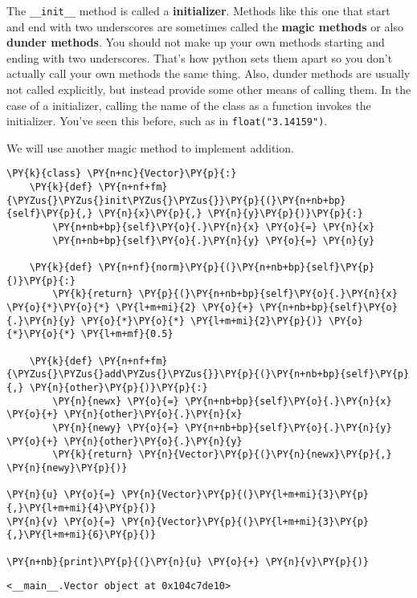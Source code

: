 The \texttt{\_\_init\_\_} method is called a \textbf{initializer}.  Methods like this one that start and end with two underscores are sometimes called the \textbf{magic methods} or also \textbf{dunder methods}.  You should not make up your own methods starting and ending with two underscores.  That's how python sets them apart so you don't actually call your own methods the same thing.  Also, dunder methods are usually not called explicitly, but instead provide some other means of calling them.  In the case of a initializer, calling the name of the class as a function invokes the initializer.  You've seen this before, such as in \texttt{float("3.14159")}.


We will use another magic method to implement addition.


\begin{Verbatim}[commandchars=\\\{\}]
\PY{k}{class} \PY{n+nc}{Vector}\PY{p}{:}
    \PY{k}{def} \PY{n+nf+fm}{\PYZus{}\PYZus{}init\PYZus{}\PYZus{}}\PY{p}{(}\PY{n+nb+bp}{self}\PY{p}{,} \PY{n}{x}\PY{p}{,} \PY{n}{y}\PY{p}{)}\PY{p}{:}
        \PY{n+nb+bp}{self}\PY{o}{.}\PY{n}{x} \PY{o}{=} \PY{n}{x}
        \PY{n+nb+bp}{self}\PY{o}{.}\PY{n}{y} \PY{o}{=} \PY{n}{y}

    \PY{k}{def} \PY{n+nf}{norm}\PY{p}{(}\PY{n+nb+bp}{self}\PY{p}{)}\PY{p}{:}
        \PY{k}{return} \PY{p}{(}\PY{n+nb+bp}{self}\PY{o}{.}\PY{n}{x} \PY{o}{*}\PY{o}{*} \PY{l+m+mi}{2} \PY{o}{+} \PY{n+nb+bp}{self}\PY{o}{.}\PY{n}{y} \PY{o}{*}\PY{o}{*} \PY{l+m+mi}{2}\PY{p}{)} \PY{o}{*}\PY{o}{*} \PY{l+m+mf}{0.5}

    \PY{k}{def} \PY{n+nf+fm}{\PYZus{}\PYZus{}add\PYZus{}\PYZus{}}\PY{p}{(}\PY{n+nb+bp}{self}\PY{p}{,} \PY{n}{other}\PY{p}{)}\PY{p}{:}
        \PY{n}{newx} \PY{o}{=} \PY{n+nb+bp}{self}\PY{o}{.}\PY{n}{x} \PY{o}{+} \PY{n}{other}\PY{o}{.}\PY{n}{x}
        \PY{n}{newy} \PY{o}{=} \PY{n+nb+bp}{self}\PY{o}{.}\PY{n}{y} \PY{o}{+} \PY{n}{other}\PY{o}{.}\PY{n}{y}
        \PY{k}{return} \PY{n}{Vector}\PY{p}{(}\PY{n}{newx}\PY{p}{,} \PY{n}{newy}\PY{p}{)}

\PY{n}{u} \PY{o}{=} \PY{n}{Vector}\PY{p}{(}\PY{l+m+mi}{3}\PY{p}{,}\PY{l+m+mi}{4}\PY{p}{)}
\PY{n}{v} \PY{o}{=} \PY{n}{Vector}\PY{p}{(}\PY{l+m+mi}{3}\PY{p}{,}\PY{l+m+mi}{6}\PY{p}{)}

\PY{n+nb}{print}\PY{p}{(}\PY{n}{u} \PY{o}{+} \PY{n}{v}\PY{p}{)}
\end{Verbatim}

\begin{Verbatim}
<__main__.Vector object at 0x104c7de10>

\end{Verbatim}


